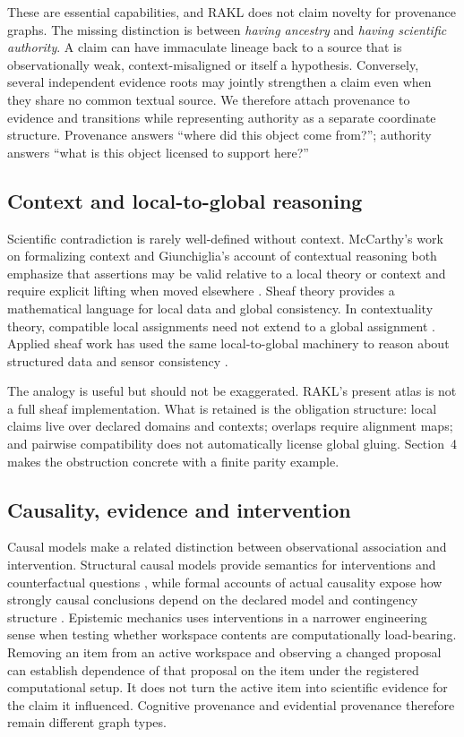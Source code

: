 \documentclass[11pt]{article}
\begin{document}
These are essential capabilities, and RAKL does not claim novelty for provenance graphs. The missing distinction is between \emph{having ancestry} and \emph{having scientific authority}. A claim can have immaculate lineage back to a source that is observationally weak, context-misaligned or itself a hypothesis. Conversely, several independent evidence roots may jointly strengthen a claim even when they share no common textual source. We therefore attach provenance to evidence and transitions while representing authority as a separate coordinate structure. Provenance answers ``where did this object come from?''; authority answers ``what is this object licensed to support here?''

\subsection{Context and local-to-global reasoning}

Scientific contradiction is rarely well-defined without context. McCarthy's work on formalizing context and Giunchiglia's account of contextual reasoning both emphasize that assertions may be valid relative to a local theory or context and require explicit lifting when moved elsewhere \cite{mccarthy1993,giunchiglia1993}. Sheaf theory provides a mathematical language for local data and global consistency. In contextuality theory, compatible local assignments need not extend to a global assignment \cite{abramsky2011}. Applied sheaf work has used the same local-to-global machinery to reason about structured data and sensor consistency \cite{curry2014,robinson2017}.

The analogy is useful but should not be exaggerated. RAKL's present atlas is not a full sheaf implementation. What is retained is the obligation structure: local claims live over declared domains and contexts; overlaps require alignment maps; and pairwise compatibility does not automatically license global gluing. Section~4 makes the obstruction concrete with a finite parity example.

\subsection{Causality, evidence and intervention}

Causal models make a related distinction between observational association and intervention. Structural causal models provide semantics for interventions and counterfactual questions \cite{pearl2009}, while formal accounts of actual causality expose how strongly causal conclusions depend on the declared model and contingency structure \cite{halpern2016}. Epistemic mechanics uses interventions in a narrower engineering sense when testing whether workspace contents are computationally load-bearing. Removing an item from an active workspace and observing a changed proposal can establish dependence of that proposal on the item under the registered computational setup. It does not turn the active item into scientific evidence for the claim it influenced. Cognitive provenance and evidential provenance therefore remain different graph types.
\end{document}
